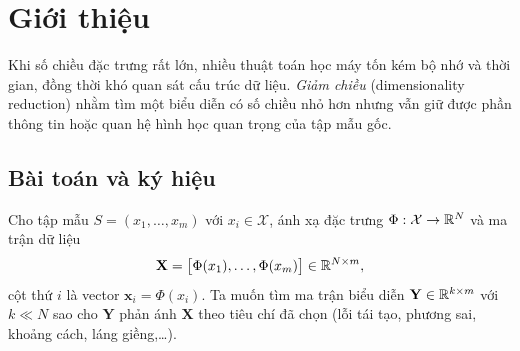 \section{Giới thiệu}

Khi số chiều đặc trưng rất lớn, nhiều thuật toán học máy tốn kém bộ nhớ và thời gian, đồng thời khó quan sát cấu trúc dữ liệu. \emph{Giảm chiều} (dimensionality reduction) nhằm tìm một biểu diễn có số chiều nhỏ hơn nhưng vẫn giữ được phần thông tin hoặc quan hệ hình học quan trọng của tập mẫu gốc.

\subsection{Bài toán và ký hiệu}

Cho tập mẫu $S = (x_1, \ldots, x_m)$ với $x_i \in \mathcal{X}$, ánh xạ đặc trưng $\Phi : \mathcal{X} \to \mathbb{R}^N$ và ma trận dữ liệu
\[
\mathbf{X} = \big[\Phi(x_1), \ldots, \Phi(x_m)\big] \in \mathbb{R}^{N \times m},
\]
cột thứ $i$ là vector $\mathbf{x}_i = \Phi(x_i)$. Ta muốn tìm ma trận biểu diễn $\mathbf{Y} \in \mathbb{R}^{k \times m}$ với $k \ll N$ sao cho $\mathbf{Y}$ phản ánh $\mathbf{X}$ theo tiêu chí đã chọn (lỗi tái tạo, phương sai, khoảng cách, láng giềng,\ldots).

